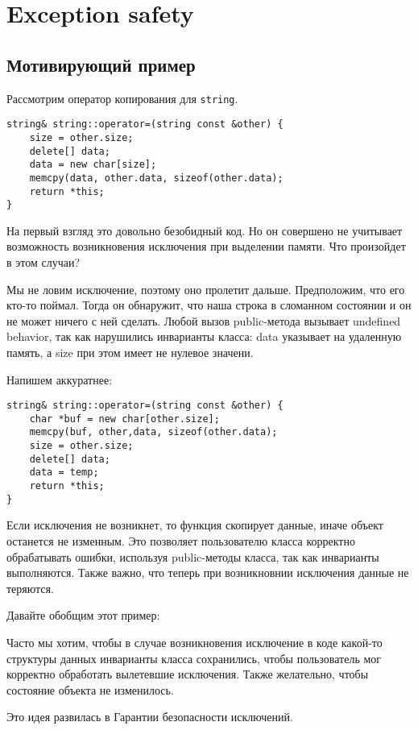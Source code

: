 \section{Exception safety}
\subsection{Мотивирующий пример}
Рассмотрим оператор копирования для \texttt{string}.
\begin{verbatim}
string& string::operator=(string const &other) {
    size = other.size;
    delete[] data;
    data = new char[size];
    memcpy(data, other.data, sizeof(other.data);
    return *this;
}
\end{verbatim}

На первый взгляд это довольно безобидный код. Но он совершено не учитывает возможность возникновения исключения при выделении памяти. Что произойдет в этом случаи?

Мы не ловим исключение, поэтому оно пролетит дальше. Предположим, что его кто-то поймал. Тогда он обнаружит, что наша строка в сломанном состоянии и он не может ничего с ней сделать. Любой вызов public-метода вызывает undefined behavior, так как нарушились инварианты класса: data указывает на удаленную память, а  size при этом имеет не нулевое значени.

Напишем аккуратнее:
\begin{verbatim}
string& string::operator=(string const &other) {
    char *buf = new char[other.size];
    memcpy(buf, other,data, sizeof(other.data);
    size = other.size;
    delete[] data;
    data = temp;
    return *this;
}
\end{verbatim}

Если исключения не возникнет, то функция скопирует данные, иначе объект останется не изменным. Это позволяет пользователю класса корректно обрабатывать ошибки, используя public-методы класса, так как инварианты выполняются. Также важно, что теперь при возникновнии исключения данные не теряются.

Давайте обобщим этот пример:

Часто мы хотим, чтобы в случае возникновения исключение в коде какой-то структуры данных инварианты класса сохранились, чтобы пользователь мог корректно обработать вылетевшие исключения. Также желательно, чтобы состояние объекта не изменилось.

Это идея развилась в Гарантии безопасности исключений.

